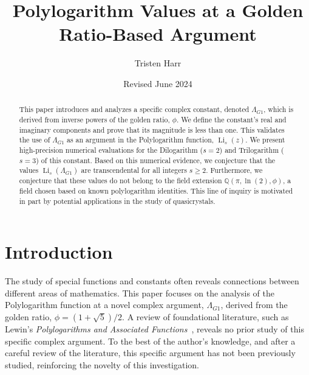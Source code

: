 \documentclass{amsart}
\theoremstyle{plain}
\theoremstyle{definition}
\theoremstyle{remark}
\DeclareMathOperator{\Li}{Li}
\newcommand{\LambdaG}{\Lambda_{G1}}
\newcommand{\phiG}{\phi}
\begin{document}
\title[Polylogarithms at a Golden Ratio Argument]{Polylogarithm Values at a Golden Ratio-Based Argument}
\author{Tristen Harr}
\date{Revised June 2024}

\begin{abstract}
This paper introduces and analyzes a specific complex constant, denoted $\LambdaG$, which is derived from inverse powers of the golden ratio, $\phiG$. We define the constant's real and imaginary components and prove that its magnitude is less than one. This validates the use of $\LambdaG$ as an argument in the Polylogarithm function, $\Li_s(z)$. We present high-precision numerical evaluations for the Dilogarithm ($s=2$) and Trilogarithm ($s=3$) of this constant. Based on this numerical evidence, we conjecture that the values $\Li_s(\LambdaG)$ are transcendental for all integers $s \ge 2$. Furthermore, we conjecture that these values do not belong to the field extension $\mathbb{Q}(\pi, \ln(2), \phiG)$, a field chosen based on known polylogarithm identities. This line of inquiry is motivated in part by potential applications in the study of quasicrystals.
\end{abstract}

\maketitle

\section{Introduction}
The study of special functions and constants often reveals connections between different areas of mathematics. This paper focuses on the analysis of the Polylogarithm function at a novel complex argument, $\LambdaG$, derived from the golden ratio, $\phiG = (1+\sqrt{5})/2$. A review of foundational literature, such as Lewin's \textit{Polylogarithms and Associated Functions}~\cite{Lewin}, reveals no prior study of this specific complex argument. To the best of the author's knowledge, and after a careful review of the literature, this specific argument has not been previously studied, reinforcing the novelty of this investigation.
\end{document}
